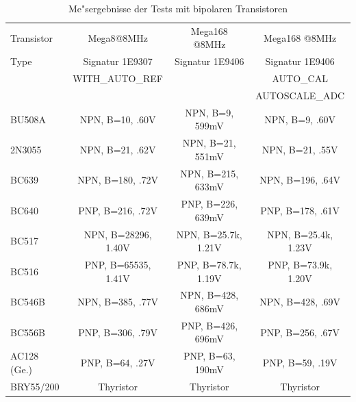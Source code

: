 \begin{table}[H]
  \begin{center}
    \begin{tabular}{| l | c | c | c |}
    \hline
 Transistor & Mega8@8MHz          & Mega168 @8MHz       & Mega168 @8MHz    \\
    Type    & Signatur 1E9307     & Signatur 1E9406     & Signatur 1E9406  \\
            & WITH\_AUTO\_REF     &                     & AUTO\_CAL        \\
            &                     &                     & AUTOSCALE\_ADC   \\
    \hline
    \hline
BU508A      & NPN, B=10, .60V     & NPN, B=9, 599mV     & NPN, B=9, .60V   \\
    \hline
2N3055      & NPN, B=21, .62V     & NPN, B=21, 551mV    & NPN, B=21, .55V  \\
    \hline
BC639       & NPN, B=180, .72V    & NPN, B=215, 633mV   & NPN, B=196, .64V \\
    \hline
BC640       & PNP, B=216, .72V    & PNP, B=226, 639mV   & PNP, B=178, .61V \\
    \hline
BC517       & NPN, B=28296, 1.40V & NPN, B=25.7k, 1.21V & NPN, B=25.4k, 1.23V\\
    \hline
BC516       & PNP, B=65535, 1.41V & PNP, B=78.7k, 1.19V & PNP, B=73.9k, 1.20V\\
    \hline
BC546B      & NPN, B=385, .77V    & NPN, B=428, 686mV   & NPN, B=428, .69V \\
    \hline
BC556B      & PNP, B=306, .79V    & PNP, B=426, 696mV   & PNP, B=256, .67V \\

    \hline
AC128 (Ge.) & PNP, B=64, .27V     & PNP, B=63, 190mV    & PNP, B=59, .19V  \\
    \hline
BRY55/200   & Thyristor           & Thyristor           & Thyristor        \\
    \hline
    \end{tabular}
  \end{center}
  \caption{Me"sergebnisse der Tests mit bipolaren Transistoren}
  \label{tab:bipolar} 
\end{table}

